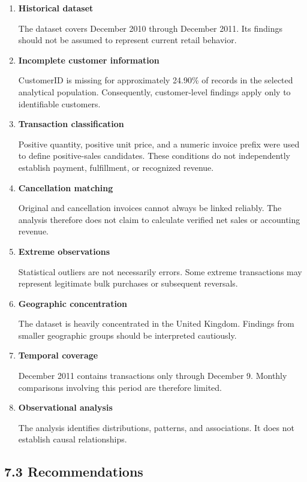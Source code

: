 \documentclass[11pt]{article}
\begin{document}
\begin{enumerate}
\def\labelenumi{\arabic{enumi}.}
\item
  \textbf{Historical dataset}

  The dataset covers December 2010 through December 2011. Its findings
  should not be assumed to represent current retail behavior.
\item
  \textbf{Incomplete customer information}

  CustomerID is missing for approximately 24.90\% of records in the
  selected analytical population. Consequently, customer-level findings
  apply only to identifiable customers.
\item
  \textbf{Transaction classification}

  Positive quantity, positive unit price, and a numeric invoice prefix
  were used to define positive-sales candidates. These conditions do not
  independently establish payment, fulfillment, or recognized revenue.
\item
  \textbf{Cancellation matching}

  Original and cancellation invoices cannot always be linked reliably.
  The analysis therefore does not claim to calculate verified net sales
  or accounting revenue.
\item
  \textbf{Extreme observations}

  Statistical outliers are not necessarily errors. Some extreme
  transactions may represent legitimate bulk purchases or subsequent
  reversals.
\item
  \textbf{Geographic concentration}

  The dataset is heavily concentrated in the United Kingdom. Findings
  from smaller geographic groups should be interpreted cautiously.
\item
  \textbf{Temporal coverage}

  December 2011 contains transactions only through December 9. Monthly
  comparisons involving this period are therefore limited.
\item
  \textbf{Observational analysis}

  The analysis identifies distributions, patterns, and associations. It
  does not establish causal relationships.
\end{enumerate}

    \subsection{7.3 Recommendations}\label{recommendations}
\end{document}
